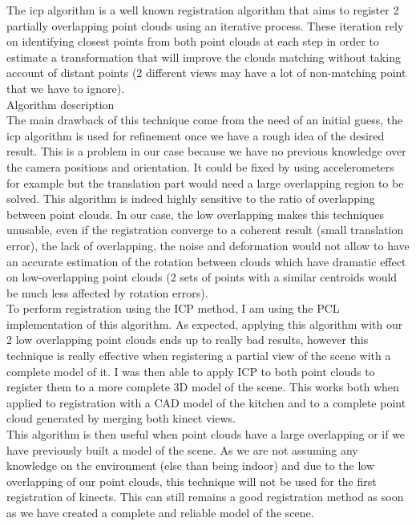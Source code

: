 The \acrlong{icp} algorithm is a well known registration algorithm that aims to register 2 partially overlapping point clouds using an iterative process. These iteration rely on identifying closest points from both point clouds at each step in order to estimate a transformation that will improve the clouds matching without taking account of distant points (2 different views may have a lot of non-matching point that we have to ignore). \\
Algorithm description \\
The main drawback of this technique come from the need of an initial guess, the \acrshort{icp} algorithm is used for refinement once we have a rough idea of the desired result. This is a problem in our case because we have no previous knowledge over the camera positions and orientation. It could be fixed by using accelerometers for example but the translation part would need a large overlapping region to be solved. This algorithm is indeed highly sensitive to the ratio of overlapping between point clouds. In our case, the low overlapping makes this techniques unusable, even if the registration converge to a coherent result (small translation error), the lack of overlapping, the noise and deformation would not allow to have an accurate estimation of the rotation between clouds which have dramatic effect on low-overlapping point clouds (2 sets of points with a similar centroids would be much less affected by rotation errors). \\
To perform registration using the ICP method, I am using the PCL implementation of this algorithm. As expected, applying this algorithm with our 2 low overlapping point clouds ends up to really bad results, however this technique is really effective when registering a partial view of the scene with a complete model of it. I was then able to apply ICP to both point clouds to register them to a more complete 3D model of the scene. This works both when applied to registration with a CAD model of the kitchen and to a complete point cloud generated by merging both kinect views. \\
This algorithm is then useful when point clouds have a large overlapping or if we have previously built a model of the scene. As we are not assuming any knowledge on the environment (else than being indoor) and due to the low overlapping of our point clouds, this technique will not be used for the first registration of kinects. This can still remains a good registration method as soon as we have created a complete and reliable model of the scene.

